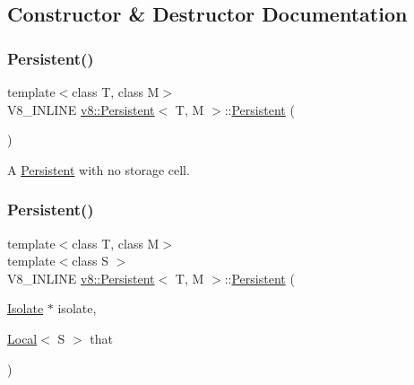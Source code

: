 \subsection{Constructor \& Destructor Documentation}
\mbox{\label{classv8_1_1Persistent_a5ce14612215393683d814056015a102d}} 
\subsubsection{\texorpdfstring{Persistent()}{Persistent()}\hspace{0.1cm}{\footnotesize\ttfamily [1/4]}}
{\footnotesize\ttfamily template$<$class T, class M$>$ \\
V8\+\_\+\+I\+N\+L\+I\+NE \mbox{\hyperlink{classv8_1_1Persistent}{v8\+::\+Persistent}}$<$ T, M $>$\+::\mbox{\hyperlink{classv8_1_1Persistent}{Persistent}} (\begin{DoxyParamCaption}{ }\end{DoxyParamCaption})\hspace{0.3cm}{\ttfamily [inline]}}

A \mbox{\hyperlink{classv8_1_1Persistent}{Persistent}} with no storage cell. \mbox{\label{classv8_1_1Persistent_aabe9a42d7971bd31173bca34186d9ac2}} 
\subsubsection{\texorpdfstring{Persistent()}{Persistent()}\hspace{0.1cm}{\footnotesize\ttfamily [2/4]}}
{\footnotesize\ttfamily template$<$class T, class M$>$ \\
template$<$class S $>$ \\
V8\+\_\+\+I\+N\+L\+I\+NE \mbox{\hyperlink{classv8_1_1Persistent}{v8\+::\+Persistent}}$<$ T, M $>$\+::\mbox{\hyperlink{classv8_1_1Persistent}{Persistent}} (\begin{DoxyParamCaption}\item[{\mbox{\hyperlink{classv8_1_1Isolate}{Isolate}} $\ast$}]{isolate,  }\item[{\mbox{\hyperlink{classv8_1_1Local}{Local}}$<$ S $>$}]{that }\end{DoxyParamCaption})\hspace{0.3cm}{\ttfamily [inline]}}

